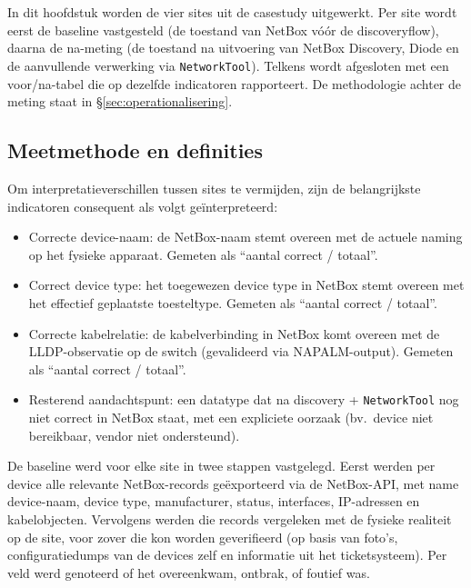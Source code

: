
\chapter{}%
\label{ch:casestudy}

In dit hoofdstuk worden de vier sites uit de casestudy uitgewerkt. Per site wordt eerst de baseline vastgesteld (de toestand van NetBox vóór de discoveryflow), daarna de na-meting (de toestand na uitvoering van NetBox Discovery, Diode en de aanvullende verwerking via \texttt{NetworkTool}). Telkens wordt afgesloten met een voor/na-tabel die op dezelfde indicatoren rapporteert. De methodologie achter de meting staat in \S\ref{sec:operationalisering}.

\section{Meetmethode en definities}
\label{sec:meetmethode-casestudy}

Om interpretatieverschillen tussen sites te vermijden, zijn de belangrijkste indicatoren consequent als volgt geïnterpreteerd:

\begin{itemize}
  \item Correcte device-naam: de NetBox-naam stemt overeen met de actuele naming op het fysieke apparaat. Gemeten als ``aantal correct / totaal''.
  \item Correct device type: het toegewezen device type in NetBox stemt overeen met het effectief geplaatste toesteltype. Gemeten als ``aantal correct / totaal''.
  \item Correcte kabelrelatie: de kabelverbinding in NetBox komt overeen met de LLDP-observatie op de switch (gevalideerd via NAPALM-output). Gemeten als ``aantal correct / totaal''.
  \item Resterend aandachtspunt: een datatype dat na discovery + \texttt{NetworkTool} nog niet correct in NetBox staat, met een expliciete oorzaak (bv.\ device niet bereikbaar, vendor niet ondersteund).
\end{itemize}

De baseline werd voor elke site in twee stappen vastgelegd. Eerst werden per device alle relevante NetBox-records geëxporteerd via de NetBox-API, met name device-naam, device type, manufacturer, status, interfaces, IP-adressen en kabelobjecten. Vervolgens werden die records vergeleken met de fysieke realiteit op de site, voor zover die kon worden geverifieerd (op basis van foto's, configuratiedumps van de devices zelf en informatie uit het ticketsysteem). Per veld werd genoteerd of het overeenkwam, ontbrak, of foutief was.

